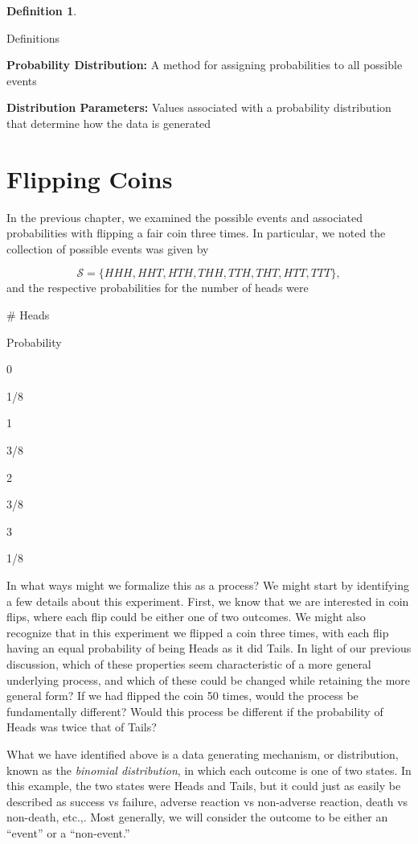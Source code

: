 \documentclass[
]{book}
\theoremstyle{definition}
\newtheorem{definition}{Definition}[chapter]
\theoremstyle{definition}
\theoremstyle{definition}
\theoremstyle{remark}
\begin{document}
\begin{definition}
\protect\hypertarget{def:unlabeled-div-1}{}\label{def:unlabeled-div-1}

Definitions

\end{definition}

\textbf{Probability Distribution: } A method for assigning probabilities to all possible events

\textbf{Distribution Parameters: } Values associated with a probability distribution that determine how the data is generated

\hypertarget{flipping-coins}{%
\section{Flipping Coins}\label{flipping-coins}}

In the previous chapter, we examined the possible events and associated probabilities with flipping a fair coin three times. In particular, we noted the collection of possible events was given by

\[\mathcal{S} = \{HHH, HHT, HTH, THH, TTH, THT, HTT, TTT\},\]
and the respective probabilities for the number of heads were

\# Heads

Probability

0

1/8

1

3/8

2

3/8

3

1/8

In what ways might we formalize this as a process? We might start by identifying a few details about this experiment. First, we know that we are interested in coin flips, where each flip could be either one of two outcomes. We might also recognize that in this experiment we flipped a coin three times, with each flip having an equal probability of being Heads as it did Tails. In light of our previous discussion, which of these properties seem characteristic of a more general underlying process, and which of these could be changed while retaining the more general form? If we had flipped the coin 50 times, would the process be fundamentally different? Would this process be different if the probability of Heads was twice that of Tails?

What we have identified above is a data generating mechanism, or distribution, known as the \emph{binomial distribution}, in which each outcome is one of two states. In this example, the two states were Heads and Tails, but it could just as easily be described as success vs failure, adverse reaction vs non-adverse reaction, death vs non-death, etc.,. Most generally, we will consider the outcome to be either an ``event'' or a ``non-event.''
\end{document}
